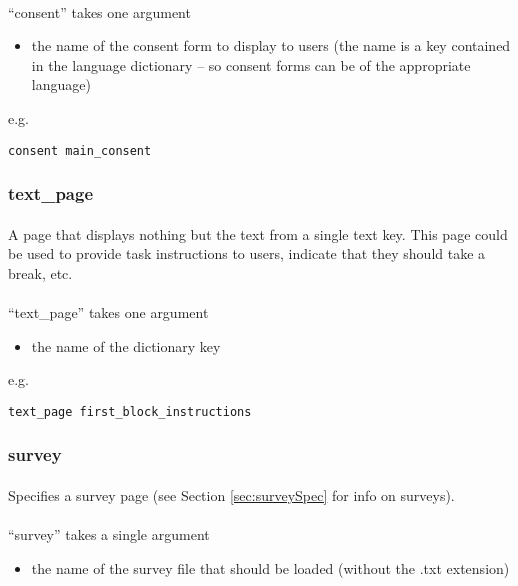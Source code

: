 \paragraph{}
``consent'' takes one argument
\begin{itemize}
\item the name of the consent form to display to users (the name is a key contained in the language dictionary -- so consent forms can be of the appropriate language)
\end{itemize}

e.g.

\begin{lstlisting}
consent main_consent
\end{lstlisting}

\subsubsection{text\_page}

\paragraph{}
A page that displays nothing but the text from a single text key.  This page could be used to provide task instructions to users, indicate that they should take a break, etc.

\paragraph{}
``text\_page'' takes one argument
\begin{itemize}
\item the name of the dictionary key
\end{itemize}
e.g.

\begin{lstlisting}
text_page first_block_instructions
\end{lstlisting}

\subsubsection{survey}

\paragraph{}
Specifies a survey page (see Section \ref{sec:surveySpec} for info on surveys).

\paragraph{}
``survey'' takes a single argument
\begin{itemize}
\item the name of the survey file that should be loaded (without the .txt extension)
\end{itemize}

